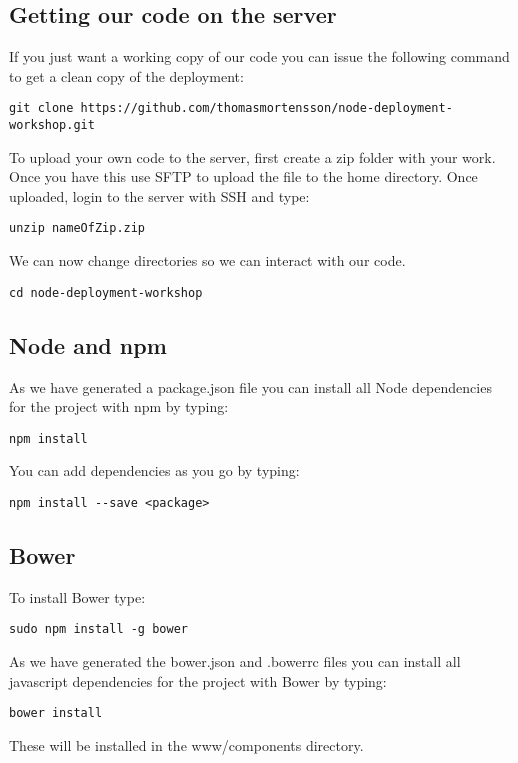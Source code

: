 \documentclass[twocolumn]{article}
\begin{document}
\subsection{Getting our code on the server}

If you just want a working copy of our code you can issue the following command to get a clean copy of the deployment:
\begin{lstlisting}
git clone https://github.com/thomasmortensson/node-deployment-workshop.git
\end{lstlisting}

To upload your own code to the server, first create a zip folder with your work. Once you have this use SFTP to upload the file to the home directory. Once uploaded, login to the server with SSH and type:
\begin{lstlisting}
unzip nameOfZip.zip
\end{lstlisting}
We can now change directories so we can interact with our code.
\begin{lstlisting}
cd node-deployment-workshop
\end{lstlisting}

\subsection{Node and npm}

As we have generated a package.json file you can install all Node dependencies for the project with npm by typing:
\begin{lstlisting}
npm install
\end{lstlisting}

You can add dependencies as you go by typing:
\begin{lstlisting}
npm install --save <package>
\end{lstlisting}

\subsection{Bower}
To install Bower type:

\begin{lstlisting}
sudo npm install -g bower
\end{lstlisting}

As we have generated the bower.json and .bowerrc files you can install all javascript dependencies for the project with Bower by typing:
\begin{lstlisting}
bower install
\end{lstlisting}
These will be installed in the www/components directory.
\end{document}
